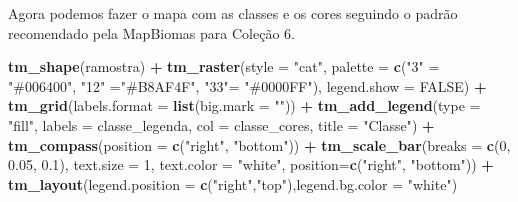 \documentclass[
]{article}
\newenvironment{Shaded}{\begin{snugshade}}{\end{snugshade}}
\newcommand{\AttributeTok}[1]{\textcolor[rgb]{0.13,0.29,0.53}{#1}}
\newcommand{\ConstantTok}[1]{\textcolor[rgb]{0.56,0.35,0.01}{#1}}
\newcommand{\DecValTok}[1]{\textcolor[rgb]{0.00,0.00,0.81}{#1}}
\newcommand{\FloatTok}[1]{\textcolor[rgb]{0.00,0.00,0.81}{#1}}
\newcommand{\FunctionTok}[1]{\textcolor[rgb]{0.13,0.29,0.53}{\textbf{#1}}}
\newcommand{\NormalTok}[1]{#1}
\newcommand{\OtherTok}[1]{\textcolor[rgb]{0.56,0.35,0.01}{#1}}
\newcommand{\SpecialCharTok}[1]{\textcolor[rgb]{0.81,0.36,0.00}{\textbf{#1}}}
\newcommand{\StringTok}[1]{\textcolor[rgb]{0.31,0.60,0.02}{#1}}
\begin{document}
Agora podemos fazer o mapa com as classes e os cores seguindo o padrão recomendado pela MapBiomas para Coleção 6.

\begin{Shaded}
\begin{Highlighting}[]
\FunctionTok{tm\_shape}\NormalTok{(ramostra) }\SpecialCharTok{+} 
  \FunctionTok{tm\_raster}\NormalTok{(}\AttributeTok{style =} \StringTok{"cat"}\NormalTok{, }
            \AttributeTok{palette =} \FunctionTok{c}\NormalTok{(}\StringTok{"3"} \OtherTok{=} \StringTok{"\#006400"}\NormalTok{, }\StringTok{"12"} \OtherTok{=}\StringTok{"\#B8AF4F"}\NormalTok{, }
                        \StringTok{"33"}\OtherTok{=} \StringTok{"\#0000FF"}\NormalTok{), }\AttributeTok{legend.show =} \ConstantTok{FALSE}\NormalTok{) }\SpecialCharTok{+} 
  \FunctionTok{tm\_grid}\NormalTok{(}\AttributeTok{labels.format =} \FunctionTok{list}\NormalTok{(}\AttributeTok{big.mark =} \StringTok{""}\NormalTok{)) }\SpecialCharTok{+}
  \FunctionTok{tm\_add\_legend}\NormalTok{(}\AttributeTok{type =} \StringTok{"fill"}\NormalTok{, }\AttributeTok{labels =}\NormalTok{ classe\_legenda,}
    \AttributeTok{col =}\NormalTok{ classe\_cores, }\AttributeTok{title =} \StringTok{"Classe"}\NormalTok{) }\SpecialCharTok{+} 
\FunctionTok{tm\_compass}\NormalTok{(}\AttributeTok{position =} \FunctionTok{c}\NormalTok{(}\StringTok{"right"}\NormalTok{, }\StringTok{"bottom"}\NormalTok{)) }\SpecialCharTok{+}
\FunctionTok{tm\_scale\_bar}\NormalTok{(}\AttributeTok{breaks =} \FunctionTok{c}\NormalTok{(}\DecValTok{0}\NormalTok{, }\FloatTok{0.05}\NormalTok{, }\FloatTok{0.1}\NormalTok{), }\AttributeTok{text.size =} \DecValTok{1}\NormalTok{, }
             \AttributeTok{text.color =} \StringTok{"white"}\NormalTok{, }\AttributeTok{position=}\FunctionTok{c}\NormalTok{(}\StringTok{"right"}\NormalTok{, }\StringTok{"bottom"}\NormalTok{)) }\SpecialCharTok{+} 
\FunctionTok{tm\_layout}\NormalTok{(}\AttributeTok{legend.position =} \FunctionTok{c}\NormalTok{(}\StringTok{"right"}\NormalTok{,}\StringTok{"top"}\NormalTok{),}\AttributeTok{legend.bg.color =} \StringTok{"white"}\NormalTok{)}
\end{Highlighting}
\end{Shaded}
\end{document}
